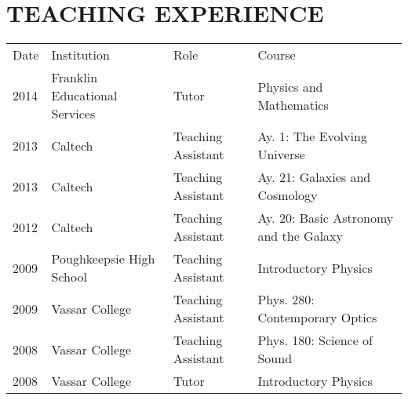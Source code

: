 \section{\large TEACHING EXPERIENCE}
\begin{tabular}{llll}
{\sc  Date}  & {\sc  Institution} & {\sc  Role} & {\sc Course}  \\
2014 & Franklin Educational Services  & Tutor & Physics and Mathematics \\
2013 & Caltech & Teaching Assistant & Ay. 1: The Evolving Universe \\
2013 & Caltech & Teaching Assistant & Ay. 21: Galaxies and Cosmology \\
2012 & Caltech & Teaching Assistant & Ay. 20: Basic Astronomy and the Galaxy \\
2009 & Poughkeepsie High School & Teaching Assistant  & Introductory Physics \\
2009 & Vassar College & Teaching Assistant & Phys. 280: Contemporary Optics \\
2008 & Vassar College & Teaching Assistant & Phys. 180: Science of Sound \\
2008 & Vassar College & Tutor & Introductory Physics \\
\end{tabular}
